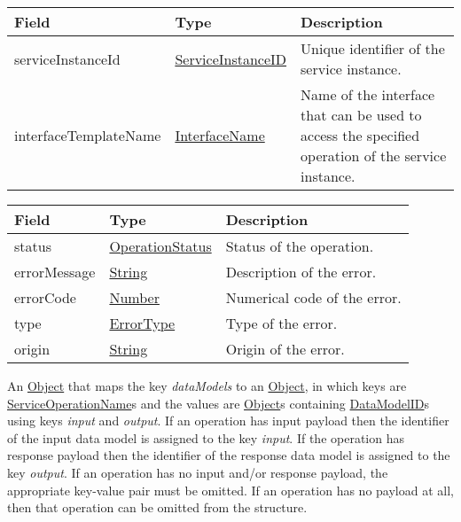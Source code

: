 \documentclass[a4paper]{arrowhead}
\newcommand{\pref}[1]{{\textcolor{ArrowheadGrey}{\hyperref[sec:model:primitives:#1]{#1}}}}
\begin{document}
\clearpage


\begin{table}[ht!]
\begin{tabularx}{\textwidth}{| p{4.25cm} | p{6.1cm} | X |} \hline
\rowcolor{gray!33} Field & Type      & Description \\ \hline
serviceInstanceId & \pref{ServiceInstanceID} & Unique identifier of the service ins\-tance. \\ \hline
interfaceTemplateName & \pref{InterfaceName} & Name of the interface that can be used to access the specified operation of the service instance. \\ \hline
\end{tabularx}
\end{table}


\begin{table}[ht!]
\begin{tabularx}{\textwidth}{| p{4.25cm} | p{3.5cm} | X |} \hline
\rowcolor{gray!33} Field & Type      & Description \\ \hline
status & \pref{OperationStatus} & Status of the operation. \\ \hline
errorMessage & \pref{String} & Description of the error. \\ \hline
errorCode &\pref{Number}  & Numerical code of the error. \\ \hline
type & \pref{ErrorType} & Type of the error. \\ \hline
origin & \pref{String} & Origin of the error. \\ \hline
\end{tabularx}
\end{table}


An \pref{Object} that maps the key \textit{dataModels} to an \pref{Object}, in which keys are \pref{ServiceOperationName}s and the values are \pref{Object}s containing \pref{DataModelID}s using keys \textit{input} and \textit{output}. If an operation has input payload then the identifier of the input data model is assigned to the key \textit{input}. If the operation has response payload then the identifier of the response data model is assigned to the key \textit{output}. If an operation has no input and/or response payload, the appropriate key-value pair must be omitted. If an operation has no payload at all, then that operation can be omitted from the structure.
\end{document}
